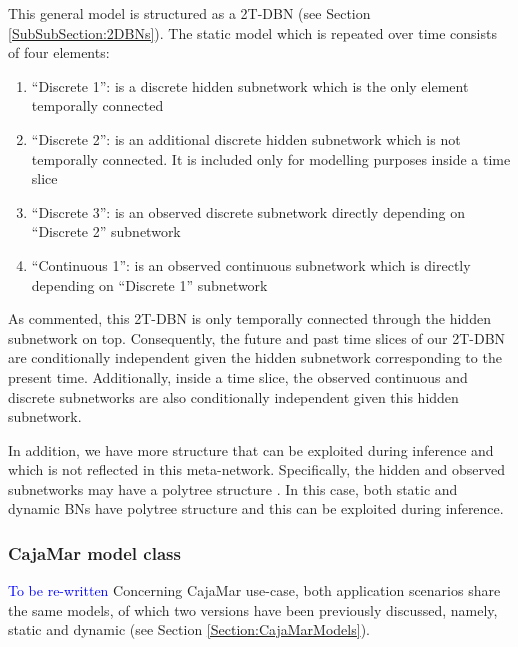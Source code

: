
This general model is structured as a 2T-DBN (see Section \ref{SubSubSection:2DBNs}). The static model which is repeated over time consists of four elements: 

\begin{enumerate}
\item ``Discrete 1'': is a discrete hidden subnetwork which is the only element temporally connected
\item ``Discrete 2'': is an additional discrete hidden subnetwork which is not temporally connected. It is included only for modelling purposes inside a time slice
\item ``Discrete 3'': is an observed discrete subnetwork directly depending on ``Discrete 2'' subnetwork
\item  ``Continuous 1'': is an observed continuous subnetwork which is directly depending on ``Discrete 1'' subnetwork
\end{enumerate}

As commented, this 2T-DBN is only temporally connected through the hidden subnetwork on top. Consequently, the future and past time slices of our 2T-DBN are conditionally independent given the hidden subnetwork corresponding to the present time. Additionally, inside a time slice, the observed continuous and discrete subnetworks are also conditionally independent given this hidden subnetwork.

In addition, we have more structure that can be exploited during inference and which is not reflected in this meta-network. Specifically, the hidden and observed subnetworks may have a polytree structure \cite{JensenNielsen2007}. In this case, both static and dynamic BNs have polytree structure and this can be exploited during inference. 

\subsubsection{CajaMar model class}
\textcolor{blue}{To be re-written}
Concerning CajaMar use-case, both application scenarios share the same models, of which two versions have been previously discussed, namely, static and dynamic (see Section \ref{Section:CajaMarModels}). 

